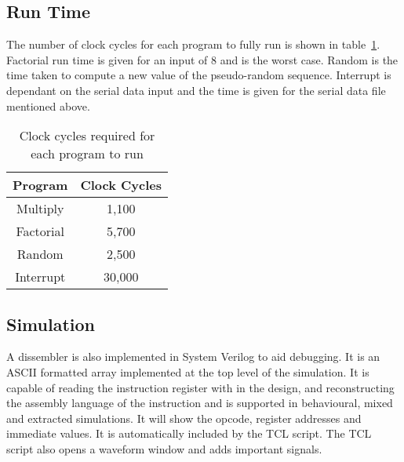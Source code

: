 

\subsection{Run Time}
The number of clock cycles for each program to fully run is shown in table~\ref{tab:runtimes}. 
Factorial run time is given for an input of 8 and is the worst case. 
Random is the time taken to compute a new value of the pseudo-random sequence. 
Interrupt is dependant on the serial data input and the time is given for the serial data file mentioned above.

\begin{table}
\centering
\caption{Clock cycles required for each program to run}
\label{tab:runtimes}
\begin{tabular}{|c|c|} \hline
Program & Clock Cycles \\ \hline
Multiply	& 1,100	\\
Factorial	& 5,700	\\
Random		& 2,500	\\
Interrupt	& 30,000	\\ \hline
\end{tabular}
\end{table}

\subsection{Simulation}

A dissembler is also implemented in System Verilog to aid debugging.
It is an ASCII formatted array implemented at the top level of the simulation. 
It is capable of reading the instruction register with in the design, and reconstructing the assembly language of the instruction and is supported in behavioural, mixed and extracted simulations.
It will show the opcode, register addresses and immediate values.
It is automatically included by the TCL script.
The TCL script also opens a waveform window and adds important signals.
